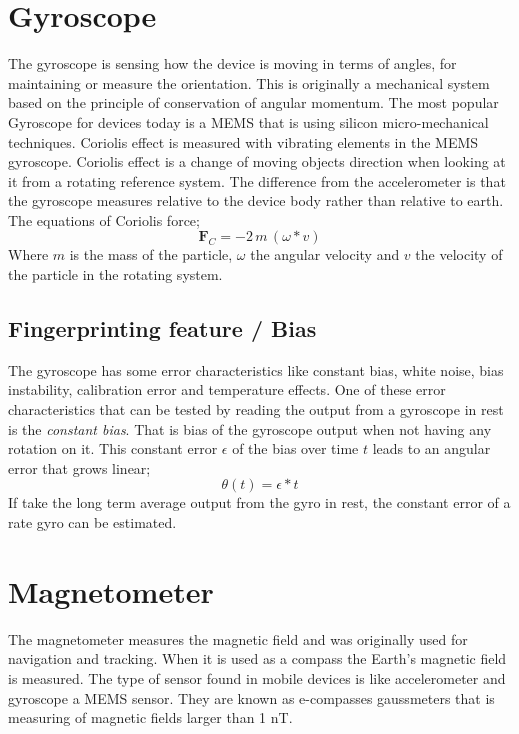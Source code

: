 \section{Gyroscope}\label{sec:gyroscope}
The gyroscope is sensing how the device is moving in terms of angles, for maintaining or measure the orientation. This is originally  a mechanical system based on the principle of conservation of angular momentum. The most popular Gyroscope for devices today is a MEMS that is using silicon micro-mechanical techniques. Coriolis effect is measured with vibrating elements in the MEMS gyroscope. Coriolis effect is a change of moving objects direction when looking at it from a rotating reference system. The difference from the accelerometer is that the gyroscope measures relative to the device body rather than relative to earth. The equations of Coriolis force;  
$$\boldsymbol{ F}_C = -2 \, m \, (\omega *  v)$$
Where $m$ is the mass of the particle, $\omega$ the angular velocity and $v$ the velocity of the particle in the rotating system. 
\cite[]{sensor:inertialNav}
\subsection{Fingerprinting feature / Bias}
The gyroscope has some error characteristics like constant bias, white noise, bias instability, calibration error and temperature effects. One of these error characteristics that can be tested by reading the output from a gyroscope in rest is the \textit{constant bias}. That is bias of the gyroscope output when not having any rotation on it. This constant error $\epsilon$ of the bias over time $t$ leads to an angular error that grows linear; 
\begin{equation} \label{eq:gyroBias}
\theta (t)= \epsilon * t
\end{equation}
If take the long term average output from the gyro in rest, the constant error of a rate gyro can be estimated.\cite[]{sensors:fusion}


\section{Magnetometer}
The magnetometer measures the magnetic field and was originally used for navigation and tracking. When it is used as a compass the Earth's magnetic field is measured. The type of sensor found in mobile devices is like accelerometer and gyroscope a MEMS sensor. They are known as e-compasses gaussmeters that is measuring of magnetic fields larger than 1 nT.
~\cite[]{sensor:magn}

